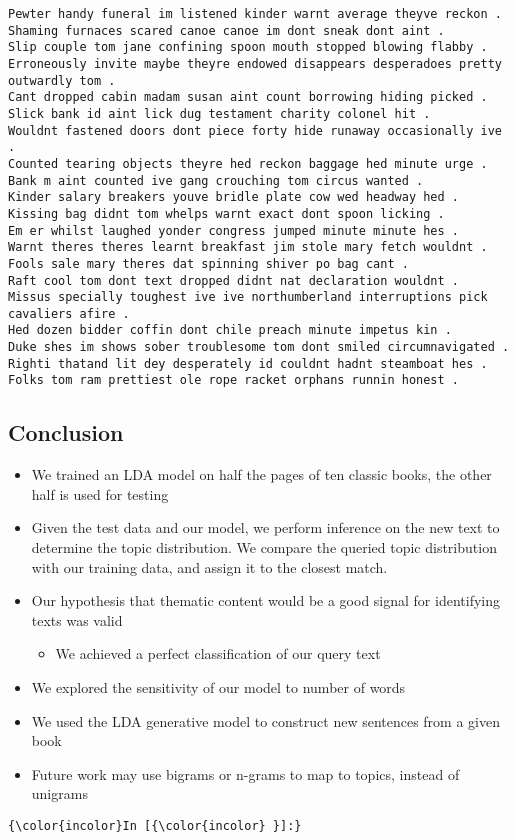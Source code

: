 \documentclass{article}
\begin{document}
    \begin{Verbatim}[commandchars=\\\{\}]
Pewter handy funeral im listened kinder warnt average theyve reckon .
Shaming furnaces scared canoe canoe im dont sneak dont aint .
Slip couple tom jane confining spoon mouth stopped blowing flabby .
Erroneously invite maybe theyre endowed disappears desperadoes pretty outwardly tom .
Cant dropped cabin madam susan aint count borrowing hiding picked .
Slick bank id aint lick dug testament charity colonel hit .
Wouldnt fastened doors dont piece forty hide runaway occasionally ive .
Counted tearing objects theyre hed reckon baggage hed minute urge .
Bank m aint counted ive gang crouching tom circus wanted .
Kinder salary breakers youve bridle plate cow wed headway hed .
Kissing bag didnt tom whelps warnt exact dont spoon licking .
Em er whilst laughed yonder congress jumped minute minute hes .
Warnt theres theres learnt breakfast jim stole mary fetch wouldnt .
Fools sale mary theres dat spinning shiver po bag cant .
Raft cool tom dont text dropped didnt nat declaration wouldnt .
Missus specially toughest ive ive northumberland interruptions pick cavaliers afire .
Hed dozen bidder coffin dont chile preach minute impetus kin .
Duke shes im shows sober troublesome tom dont smiled circumnavigated .
Righti thatand lit dey desperately id couldnt hadnt steamboat hes .
Folks tom ram prettiest ole rope racket orphans runnin honest .
    \end{Verbatim}

    \subsection{Conclusion}\label{conclusion}

    \begin{itemize}
\itemsep1pt\parskip0pt
\item
  We trained an LDA model on half the pages of ten classic books, the
  other half is used for testing
\item
  Given the test data and our model, we perform inference on the new
  text to determine the topic distribution. We compare the queried topic
  distribution with our training data, and assign it to the closest
  match.
\item
  Our hypothesis that thematic content would be a good signal for
  identifying texts was valid

  \begin{itemize}
  \itemsep1pt\parskip0pt
  \item
    We achieved a perfect classification of our query text
  \end{itemize}
\item
  We explored the sensitivity of our model to number of words
\item
  We used the LDA generative model to construct new sentences from a
  given book
\item
  Future work may use bigrams or n-grams to map to topics, instead of
  unigrams
\end{itemize}

    \begin{Verbatim}[commandchars=\\\{\}]
{\color{incolor}In [{\color{incolor} }]:} 
\end{Verbatim}


    
    
    
    
\end{document}
